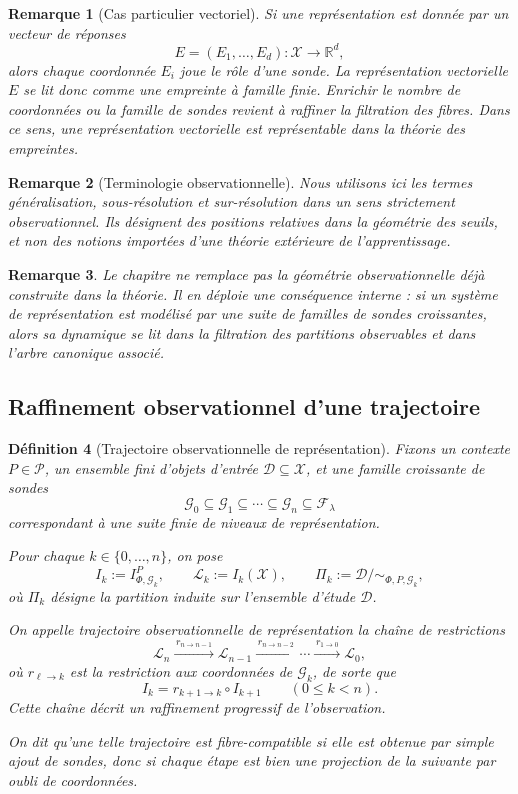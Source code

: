 \documentclass[11pt,a4paper,openany]{book}
\newtheorem{definition}{Définition}[chapter]
\newtheorem{remark}[definition]{Remarque}
\begin{document}
\begin{remark}[Cas particulier vectoriel]
Si une représentation est donnée par un vecteur de réponses
\[
E=(E_1,\ldots,E_d):\mathcal X\to\mathbb R^d,
\]
alors chaque coordonnée \(E_i\) joue le rôle d'une sonde. La représentation vectorielle \(E\) se lit donc comme une empreinte à famille finie. Enrichir le nombre de coordonnées ou la famille de sondes revient à raffiner la filtration des fibres. Dans ce sens, une représentation vectorielle est représentable dans la théorie des empreintes.
\end{remark}

\begin{remark}[Terminologie observationnelle]
Nous utilisons ici les termes \emph{généralisation}, \emph{sous-résolution} et \emph{sur-résolution} dans un sens strictement observationnel. Ils désignent des positions relatives dans la géométrie des seuils, et non des notions importées d'une théorie extérieure de l'apprentissage.
\end{remark}

\begin{remark}
Le chapitre ne remplace pas la géométrie observationnelle déjà construite dans la théorie. Il en déploie une conséquence interne : si un système de représentation est modélisé par une suite de familles de sondes croissantes, alors sa dynamique se lit dans la filtration des partitions observables et dans l'arbre canonique associé.
\end{remark}

\subsection{Raffinement observationnel d'une trajectoire}

\begin{definition}[Trajectoire observationnelle de représentation]
Fixons un contexte \(P\in\mathcal P\), un ensemble fini d'objets d'entrée \(\mathcal D\subseteq\mathcal X\), et une famille croissante de sondes
\[
\mathcal G_0\subseteq \mathcal G_1\subseteq \cdots \subseteq \mathcal G_n \subseteq \mathcal F_\lambda
\]
correspondant à une suite finie de niveaux de représentation.

Pour chaque \(k\in\{0,\ldots,n\}\), on pose
\[
I_k:=I_{\Phi,\mathcal G_k}^P,
\qquad
\mathcal L_k:=I_k(\mathcal X),
\qquad
\Pi_k:=\mathcal D/{\sim_{\Phi,P,\mathcal G_k}},
\]
où \(\Pi_k\) désigne la partition induite sur l'ensemble d'étude \(\mathcal D\).

On appelle \emph{trajectoire observationnelle de représentation} la chaîne de restrictions
\[
\mathcal L_n
\xrightarrow{\,r_{n\to n-1}\,}
\mathcal L_{n-1}
\xrightarrow{\,r_{n\to n-2}\,}
\cdots
\xrightarrow{\,r_{1\to 0}\,}
\mathcal L_0,
\]
où \(r_{\ell\to k}\) est la restriction aux coordonnées de \(\mathcal G_k\), de sorte que
\[
I_k=r_{k+1\to k}\circ I_{k+1}
\qquad (0\le k<n).
\]
Cette chaîne décrit un raffinement progressif de l'observation.

On dit qu'une telle trajectoire est \emph{fibre-compatible} si elle est obtenue par simple ajout de sondes, donc si chaque étape est bien une projection de la suivante par oubli de coordonnées.
\end{definition}
\end{document}
